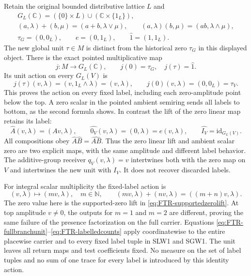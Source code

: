 Retain the original bounded distributive lattice $L$ and
\begin{equation}\tag{FTR6}\label{eq:FTR-GL}
 \begin{gathered}
 G_L(\mathbb C)=(\{0\}\times L)
                   \cup(\mathbb C\times\{1_L\}),\\
 (a,\lambda)+(b,\mu)=(a+b,\lambda\vee\mu),\qquad
 (a,\lambda)(b,\mu)=(ab,\lambda\wedge\mu),\\
 \tau_G=(0,0_L),\qquad e=(0,1_L),\qquad
 \widehat1=(1,1_L).
 \end{gathered}
\end{equation}
The new global unit $\tau\in M$ is distinct from the historical
zero $\tau_G$ in this displayed object. There is the exact pointed
multiplicative map
\begin{equation}\tag{FTR7}\label{eq:FTR-pointedGL}
 j:M\longrightarrow G_L(\mathbb C),\qquad
       j(0)=\tau_G,\quad j(\tau)=\widehat1.
\end{equation}
Its unit action on every $G_L(V)$ is
\begin{equation}\tag{FTR8}\label{eq:FTR-fullbranchunit}
 j(\tau)(v,\lambda)=(v,1_L\wedge\lambda)=(v,\lambda),
 \qquad j(0)(v,\lambda)=(0,0_L)=\tau_V.
\end{equation}
This proves the action on every fixed label, including each
zero-amplitude point below the top. A zero scalar in the pointed
ambient semiring sends all labels to bottom, as the second formula
shows. In contrast the lift of the zero linear map retains its
label:
\begin{equation}\tag{FTR9}\label{eq:FTR-supportedzerolift}
 \widehat A(v,\lambda)=(Av,\lambda),\qquad
 \widehat{0_V}(v,\lambda)=(0,\lambda)=e(v,\lambda),\qquad
 \widehat{I_V}=\mathrm{id}_{G_L(V)}.
\end{equation}
All compositions obey $\widehat A\widehat B=\widehat{AB}$.
Thus the zero linear lift and ambient scalar zero are two
explicit maps, with the same amplitude and different label behavior.
The additive-group receiver $q_V(v,\lambda)=v$ intertwines
both with the zero map on $V$ and intertwines the new unit
with $I_V$. It does not recover discarded labels.

For integral scalar multiplicity the fixed-label action is
\begin{equation}\tag{FTR10}\label{eq:FTR-labelledcounts}
 (v,\lambda)\longmapsto(mv,\lambda),\quad m\in\mathbb N,
 \qquad
 (mv,\lambda)+(nv,\lambda)=((m+n)v,\lambda).
\end{equation}
The zero value here is the supported-zero lift in
\eqref{eq:FTR-supportedzerolift}. At top amplitude $v\ne0$,
the outputs for $m=1$ and $m=2$ are different, proving the same
failure of the presence factorization on the full carrier.
Equations \eqref{eq:FTR-fullbranchunit}--\eqref{eq:FTR-labelledcounts}
apply coordinatewise to the entire placewise carrier and to every
fixed label tuple in SLW1 and SGW1.
The unit leaves all return maps and test coefficients fixed.
No measure on the set of label tuples and no sum of one trace
for every label is introduced by this identity action.

